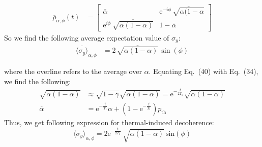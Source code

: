 \begin{align}
    \overline{\rho}_{\alpha,\phi}(t) &= 
    \begin{bmatrix} 
    \overline{\alpha} & \text{e}^{-i\phi} \, \overline{\sqrt{\alpha(1-\alpha}} \\
    \text{e}^{i\phi} \, \overline{\sqrt{\alpha(1-\alpha)}} & 1 - \overline{\alpha}
    \end{bmatrix}
\end{align}
So we find the following average expectation value of $\sigma_y$:
\begin{align}
    \overline{\langle\sigma_{y}\rangle}_{\alpha,\phi} &= 
    2 \, \overline{\sqrt{\alpha(1-\alpha)}} \, \sin(\phi)
\end{align}


where the overline refers to the average over $\alpha$. Equating Eq.~(40) with Eq.~(34), we find the following:
\begin{subequations}
\begin{align}
    \overline{\sqrt{\alpha(1-\alpha)}} &\approx \sqrt{1-\gamma}\sqrt{\alpha(1-\alpha)} = \text{e}^{-\frac{t}{2T_{1}}}\sqrt{\alpha(1-\alpha)}\\
    \overline{\alpha} &= \text{e}^{-\frac{t}{T_{1}}}\alpha + (1- \text{e}^{-\frac{t}{T_{1}}})p_{\text{th}}
\end{align}    
\end{subequations}
Thus, we get following expression for thermal-induced decoherence:
\begin{equation}
\overline{\langle\sigma_{y}\rangle}_{\alpha,\phi} = 2\text{e}^{-\frac{t}{2T_{1}}}~\sqrt{\alpha(1-\alpha)}~\text{sin}(\phi) 
\end{equation}

